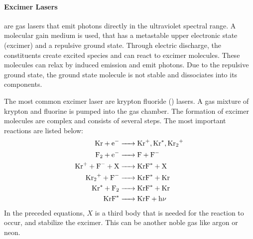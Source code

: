 \paragraph{Excimer Lasers} are gas lasers that emit photons directly in the ultraviolet 
spectral range.
A molecular gain medium is used, that has a metastable upper electronic state (excimer) 
and a repulsive ground state.
Through electric discharge, the constituents create excited species and can react to
excimer molecules.
These molecules can relax by induced emission and emit photons.
Due to the repulsive ground state, the ground state molecule is not stable and
dissociates into its components.

The most common excimer laser are krypton fluoride () lasers.
A gas mixture of krypton and fluorine is pumped into the gas chamber. 
The formation of excimer molecules are complex and consists of several steps.
The most important reactions are listed below:
\begin{align*}
	\ce{Kr + e- &-> Kr+, Kr^*, Kr_2^+} \\
	\ce{F2 + e- &-> F + F-} \\
	\ce{Kr+ + F- + X &-> KrF^* + X} \\
	\ce{Kr_2^+ + F- &-> KrF^* + Kr} \\
	\ce{Kr^* + F2 &-> KrF^* + Kr} \\
	\ce{KrF^* &-> KrF + h\nu}
\end{align*}
In the preceded equations, $X$ is a third body that is needed for the reaction to occur,
and stabilize the excimer. 
This can be another noble gas like argon or neon.

